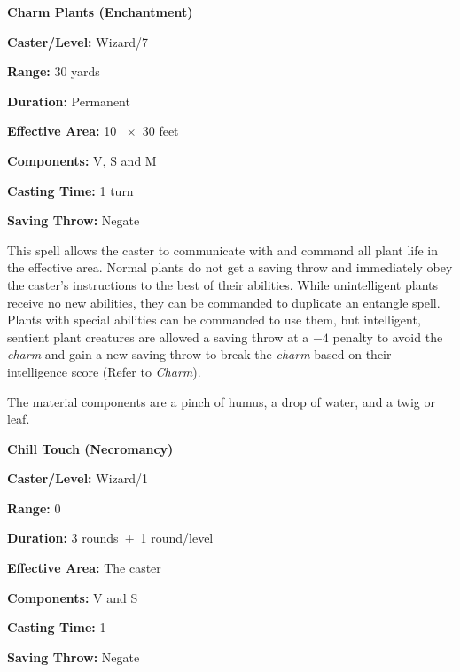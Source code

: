 \begin{multicols}{2}
\vspace{1em}

\noindent
\begin{minipage}{\columnwidth}

\noindent \textbf{Charm Plants (Enchantment)}

\noindent \textbf{Caster/Level:} Wizard/7

\noindent \textbf{Range:} 30 yards

\noindent \textbf{Duration:} Permanent

\noindent \textbf{Effective Area:} 10 ~$\times$~30 feet

\noindent \textbf{Components:} V, S and M

\noindent \textbf{Casting Time:} 1 turn

\noindent \textbf{Saving Throw:} Negate

\end{minipage}

This spell allows the caster to communicate with and command all plant life in the effective area.  Normal plants do not get a saving throw and immediately obey the caster's instructions to the best of their abilities.  While unintelligent plants receive no new abilities, they can be commanded to duplicate an entangle spell.  Plants with special abilities can be commanded to use them, but intelligent, sentient plant creatures are allowed a saving throw at a $-4$ penalty to avoid the \textit{charm} and gain a new saving throw to break the \textit{charm} based on their intelligence score (Refer to \textit{Charm}).

The material components are a pinch of humus, a drop of water, and a twig or leaf.

\vspace{1em}

\noindent
\begin{minipage}{\columnwidth}

\noindent \textbf{Chill Touch (Necromancy)}

\noindent \textbf{Caster/Level:} Wizard/1

\noindent \textbf{Range:} 0

\noindent \textbf{Duration:} 3 rounds~+~1 round/level

\noindent \textbf{Effective Area:} The caster

\noindent \textbf{Components:} V and S

\noindent \textbf{Casting Time:} 1

\noindent \textbf{Saving Throw:} Negate


\end{minipage}
\end{multicols}
